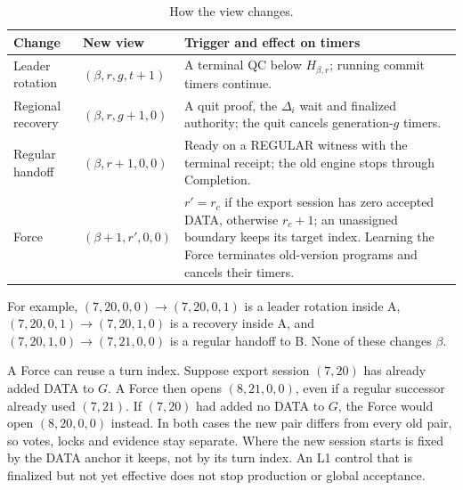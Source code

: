 \documentclass[11pt,a4paper]{article}
\begin{document}
\begin{table}[htbp]\centering\small
\caption{How the view changes.}\label{tab:views}
\begin{tabularx}{\linewidth}{@{}>{\raggedright\arraybackslash}p{.19\linewidth}>{\raggedright\arraybackslash}p{.25\linewidth}Y@{}}\toprule
Change & New view & Trigger and effect on timers\\\midrule
Leader rotation & $(\beta,r,g,t+1)$ & A terminal QC below $H_{\beta,r}$;
running commit timers continue.\\
Regional recovery & $(\beta,r,g+1,0)$ & A quit proof, the $\Delta_i$ wait
and finalized authority; the quit cancels generation-$g$ timers.\\
Regular handoff & $(\beta,r+1,0,0)$ & Ready on a REGULAR witness
with the terminal receipt; the old engine stops through Completion.\\
Force & $(\beta+1,r',0,0)$ & $r'=r_c$ if the export session has zero
accepted DATA, otherwise $r_c+1$; an unassigned boundary keeps its
target index. Learning the Force terminates old-version programs
and cancels their timers.\\
\bottomrule\end{tabularx}
\end{table}

For example, $(7,20,0,0)\to(7,20,0,1)$ is a leader rotation inside A,
$(7,20,0,1)\to(7,20,1,0)$ is a recovery inside A, and
$(7,20,1,0)\to(7,21,0,0)$ is a regular handoff to B. None of these
changes $\beta$.

A Force can reuse a turn index. Suppose export session $(7,20)$ has
already added DATA to $G$. A Force then opens $(8,21,0,0)$, even if
a regular successor already used $(7,21)$. If $(7,20)$ had added no
DATA to $G$, the Force would open $(8,20,0,0)$ instead. In both cases
the new pair differs from every old pair, so votes, locks and evidence
stay separate. Where the new session starts is fixed by the DATA anchor
it keeps, not by its turn index. An L1 control that is finalized but
not yet effective does not stop production or global acceptance.
\end{document}
